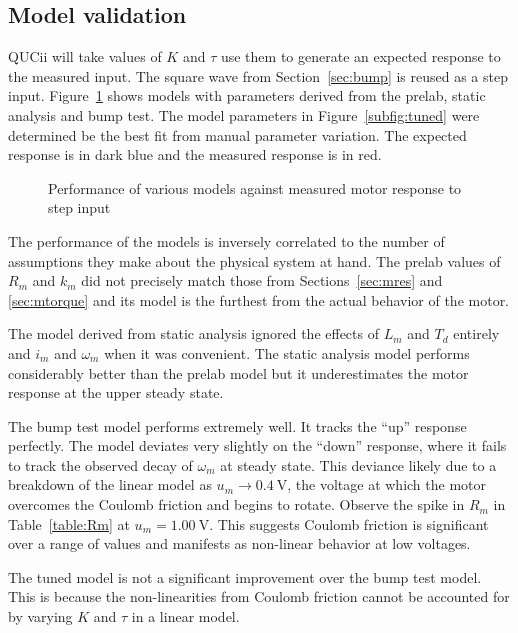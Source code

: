 \subsection{Model validation}\label{sec:validation}
QUCii will take values of $K$ and $\tau$ use them to generate an expected response to the measured input.
The square wave from Section~\ref{sec:bump} is reused as a step input.
Figure~\ref{fig:validation} shows models with parameters derived from the prelab, static analysis and bump test.
The model parameters in Figure~\ref{subfig:tuned} were determined be the best fit from manual parameter variation.
The expected response is in dark blue and the measured response is in red.
\begin{figure}[t!]
  \caption{Performance of various models against measured motor response to step input}
  \label{fig:validation}
\end{figure}

The performance of the models is inversely correlated to the number of assumptions they make about the physical system at hand.
The prelab values of $R_m$ and $k_m$ did not precisely match those from Sections~\ref{sec:mres} and \ref{sec:mtorque} and its model is the furthest from the actual behavior of the motor.

The model derived from static analysis ignored the effects of $L_m$ and $T_d$ entirely and $i_m$ and $\omega_m$ when it was convenient.
The static analysis model performs considerably better than the prelab model but it underestimates the motor response at the upper steady state.

The bump test model performs extremely well.
It tracks the ``up'' response perfectly.
The model deviates very slightly on the ``down'' response, where it fails to track the observed decay of $\omega_m$ at steady state.
This deviance likely due to a breakdown of the linear model as $u_m \rightarrow \SI{0.4}{\volt}$, the voltage at which the motor overcomes the Coulomb friction and begins to rotate.
Observe the spike in $R_m$ in Table~\ref{table:Rm} at $u_m = \SI{1.00}{\volt}$.
This suggests Coulomb friction is significant over a range of values and manifests as non-linear behavior at low voltages. 

The tuned model is not a significant improvement over the bump test model.
This is because the non-linearities from Coulomb friction cannot be accounted for by varying $K$ and $\tau$ in a linear model.
